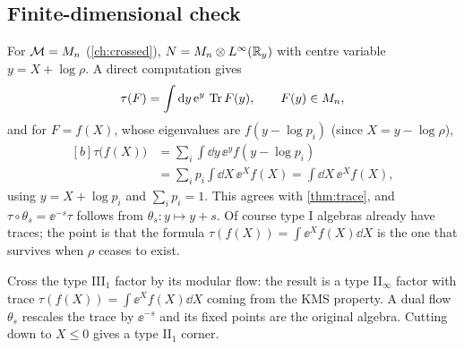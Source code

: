 \subsection{Finite-dimensional check}
For $\mathcal{M}=M_n$ (\cref{ch:crossed}), $N=M_n\otimes L^\infty(\mathbb{R}_y)$ with centre variable $y=X+\log\rho$. A direct computation gives
\begin{equation}
\tau(F)=\int\mathrm{d} y\,\mathrm{e}^{y}\,\operatorname{Tr} F(y),\qquad F(y)\in M_n,
\end{equation}
and for $F=f(X)$, whose eigenvalues are $f(y-\log p_i)$ (since $X=y-\log\rho$),
\begin{equation}
\begin{aligned}[b]\tau\big(f(X)\big)&=\sum_i\int\dd y\,\ee^{y}f(y-\log p_i)\\&=\sum_ip_i\int\dd X\,\ee^{X}f(X)=\int\dd X\,\ee^Xf(X),\end{aligned}
\end{equation}
using $y=X+\log p_i$ and $\sum_ip_i=1$. This agrees with \cref{thm:trace}, and $\tau\circ\theta_s=\ee^{-s}\tau$ follows from $\theta_s:y\mapsto y+s$. Of course type I algebras already have traces; the point is that the formula $\tau(f(X))=\int\ee^Xf(X)\dd X$ is the one that survives when $\rho$ ceases to exist.

\begin{keyidea}
Cross the type III$_1$ factor by its modular flow: the result is a type II$_\infty$ factor with trace $\tau(f(X))=\int\ee^{X}f(X)\dd X$ coming from the KMS property. A dual flow $\theta_s$ rescales the trace by $\ee^{-s}$ and its fixed points are the original algebra. Cutting down to $X\le0$ gives a type II$_1$ corner.
\end{keyidea}

